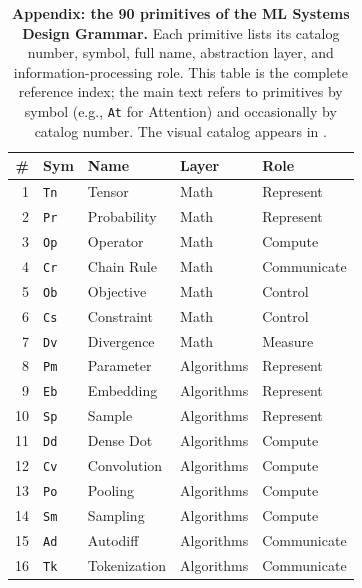 
\begin{table}[!t]
\centering
\caption{\textbf{Appendix: the 90 primitives of the ML Systems Design Grammar.} Each primitive lists its catalog number, symbol, full name, abstraction layer, and information-processing role. This table is the complete reference index; the main text refers to primitives by symbol (e.g., \texttt{At} for Attention) and occasionally by catalog number. The visual catalog appears in .}
\label{tab:appendix-primitives}
\footnotesize
\setlength{\tabcolsep}{4pt}
\renewcommand{\arraystretch}{1.08}
\begin{minipage}[t]{0.49\textwidth}
\centering
\begin{tabular}{@{}r l l l l@{}}
\toprule
\textbf{\#} & \textbf{Sym} & \textbf{Name} & \textbf{Layer} & \textbf{Role} \\
\midrule
1 & \texttt{Tn} & Tensor & Math & Represent \\
2 & \texttt{Pr} & Probability & Math & Represent \\
3 & \texttt{Op} & Operator & Math & Compute \\
4 & \texttt{Cr} & Chain Rule & Math & Communicate \\
5 & \texttt{Ob} & Objective & Math & Control \\
6 & \texttt{Cs} & Constraint & Math & Control \\
7 & \texttt{Dv} & Divergence & Math & Measure \\
8 & \texttt{Pm} & Parameter & Algorithms & Represent \\
9 & \texttt{Eb} & Embedding & Algorithms & Represent \\
10 & \texttt{Sp} & Sample & Algorithms & Represent \\
11 & \texttt{Dd} & Dense Dot & Algorithms & Compute \\
12 & \texttt{Cv} & Convolution & Algorithms & Compute \\
13 & \texttt{Po} & Pooling & Algorithms & Compute \\
14 & \texttt{Sm} & Sampling & Algorithms & Compute \\
15 & \texttt{Ad} & Autodiff & Algorithms & Communicate \\
16 & \texttt{Tk} & Tokenization & Algorithms & Communicate \\

\end{tabular}
\end{minipage}
\end{table}
